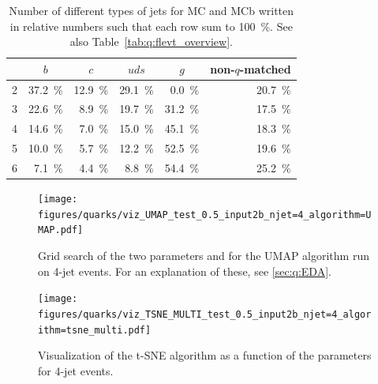 
\begin{table}
  \centering
  \begin{tabular}{@{}rrrrrr@{}}
    {}    & \multicolumn{1}{c}{$b$} & \multicolumn{1}{c}{$c$} & \multicolumn{1}{c}{$uds$} & \multicolumn{1}{c}{$g$} & non-$q$-matched     \\ 
    \midrule
    2 & \SI{37.2}{\percent}  & \SI{12.9}{\percent}  & \SI{29.1}{\percent} &  \SI{0.0}{\percent} & \SI{20.7}{\percent}  \\
    3 & \SI{22.6}{\percent}  &  \SI{8.9}{\percent}  & \SI{19.7}{\percent} & \SI{31.2}{\percent} & \SI{17.5}{\percent}  \\
    4 & \SI{14.6}{\percent}  &  \SI{7.0}{\percent}  & \SI{15.0}{\percent} & \SI{45.1}{\percent} & \SI{18.3}{\percent}  \\
    5 & \SI{10.0}{\percent}  &  \SI{5.7}{\percent}  & \SI{12.2}{\percent} & \SI{52.5}{\percent} & \SI{19.6}{\percent}  \\
    6 &  \SI{7.1}{\percent}  &  \SI{4.4}{\percent}  &  \SI{8.8}{\percent} & \SI{54.4}{\percent} & \SI{25.2}{\percent}  \\
  \end{tabular}
  \caption{Number of different types of jets for MC and MCb written in relative numbers such that each row sum to \SI{100}{\percent}. See also Table~\ref{tab:q:flevt_overview}.}
  \label{tab:q:flevt_overview_percent_relative}
\end{table}


\newpage
\begin{figure}[h!]
  \centerfloat
  \texttt{[image: figures/quarks/viz\_UMAP\_test\_0.5\_input2b\_njet=4\_algorithm=UMAP.pdf]}
  \caption[UMAP Parameter Grid Search]
          {Grid search of the two parameters  and  for the UMAP algorithm run on 4-jet events. For an explanation of these, see \autoref{sec:q:EDA}.} 
  \label{fig:q:UMAP_vertex_all}
\end{figure}

\vspace{2cm}

\begin{figure}[h!]
  \centerfloat
  \texttt{[image: figures/quarks/viz\_TSNE\_MULTI\_test\_0.5\_input2b\_njet=4\_algorithm=tsne\_multi.pdf]}
  \caption[Visualization of the t-SNE algorithm]
          {Visualization of the t-SNE algorithm as a function of the  parameters for 4-jet events.} 
  \label{fig:q:tsne_vertex}
\end{figure}

